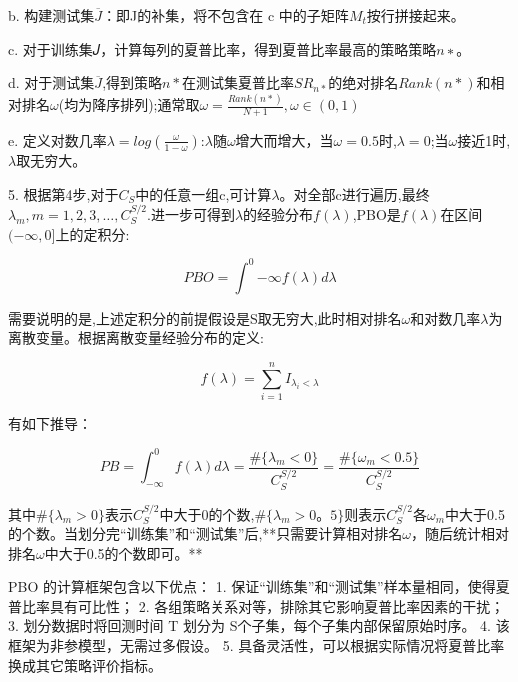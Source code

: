 \documentclass{scrartcl}
\numberwithin{equation}{section}
\begin{document}
    b. 构建测试集$\overline{J}$：即J的补集，将不包含在 c 中的子矩阵$𝑀_𝑡$按行拼接起来。
    
    c. 对于训练集𝐽，计算每列的夏普比率，得到夏普比率最高的策略策略$𝑛∗$。
    
    d. 对于测试集$\overline{J}$,得到策略$n*$在测试集夏普比率$SR_{n*}$的绝对排名$Rank(n*)$和相对排名$\omega$(均为降序排列);通常取$\omega=\frac{Rank(n*)}{N+1},\omega\in(0,1)$
    
    e. 定义对数几率$\lambda=log(\frac{\omega}{1-\omega})$:$\lambda$随$\omega$增大而增大，当$\omega=0.5$时,$\lambda=0$;当$\omega$接近1时,$\lambda$取无穷大。

5. 根据第4步,对于$C_S$中的任意一组c,可计算$\lambda$。对全部c进行遍历,最终$\lambda_m,m=1,2,3,\dots,C^{S/2}_S$.进一步可得到$\lambda$的经验分布$f(\lambda)$,PBO是$f(\lambda)$在区间$(-\infty,0]$上的定积分:

$$PBO=\int^{0}{-\infty}f(\lambda)d\lambda$$

需要说明的是,上述定积分的前提假设是S取无穷大,此时相对排名$\omega$和对数几率$\lambda$为离散变量。根据离散变量经验分布的定义:

$$f(\lambda)=\sum^{n}_{i=1}I_{\lambda_i<\lambda}$$

有如下推导：

$$PB=\int^{0}_{-\infty}f(\lambda)d\lambda=\frac{\#\{\lambda_m<0\}}{C^{S/2}_{S}}=\frac{\#\{\omega_m<0.5\}}{C^{S/2}_{S}}$$

其中$\#\{\lambda_m>0\}$表示$C^{S/2}_{S}$中大于0的个数,$\#\{\lambda_m>0。5\}$则表示$C^{S/2}_{S}$各$\omega_m$中大于0.5的个数。当划分完“训练集”和“测试集”后,**只需要计算相对排名$\omega$，随后统计相对排名$\omega$中大于0.5的个数即可。**


PBO 的计算框架包含以下优点： 
1. 保证“训练集”和“测试集”样本量相同，使得夏普比率具有可比性； 
2. 各组策略关系对等，排除其它影响夏普比率因素的干扰； 
3. 划分数据时将回测时间 T 划分为 S个子集，每个子集内部保留原始时序。 
4. 该框架为非参模型，无需过多假设。
5. 具备灵活性，可以根据实际情况将夏普比率换成其它策略评价指标。
\end{document}
